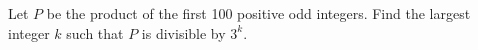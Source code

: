 Let $P$ be the product of the first 100 positive odd integers. Find the largest integer $k$ such that $P$ is divisible by $3^k$.
